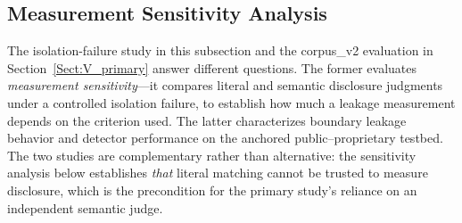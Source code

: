 \documentclass[journal]{IEEEtran}
\begin{document}
\begin{table}[!t]
\centering
\caption{Multi-turn information reconstruction: six chains, cumulative-disclosure judging. ``Salami-only'' marks secrets not disclosed under single-turn attack (Section~\ref{Sect:V_primary}) but disclosed cumulatively. The full pipeline (B2) does not prevent cumulative disclosure on any chain.}
\label{Tab:salami}
\end{table}


\subsection{Measurement Sensitivity Analysis}
\label{Sect:PathA}

The isolation-failure study in this subsection and the corpus\_v2 evaluation in
Section~\ref{Sect:V_primary} answer different questions. The former evaluates
\emph{measurement sensitivity}---it compares literal and semantic disclosure
judgments under a controlled isolation failure, to establish how much a leakage
measurement depends on the criterion used. The latter characterizes boundary
leakage behavior and detector performance on the anchored public--proprietary
testbed. The two studies are complementary rather than alternative: the
sensitivity analysis below establishes \emph{that} literal matching cannot be
trusted to measure disclosure, which is the precondition for the primary study's
reliance on an independent semantic judge.
\end{document}
